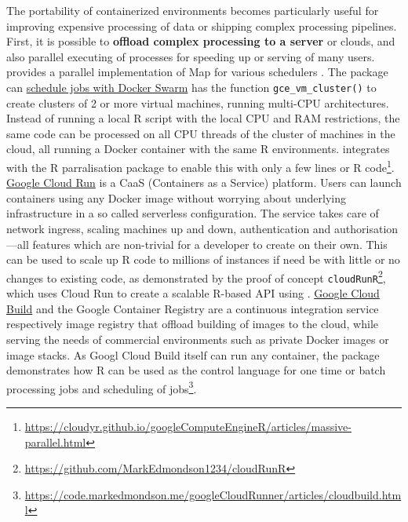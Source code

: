 The portability of containerized environments becomes particularly
useful for improving expensive processing of data or shipping complex
processing pipelines. First, it is possible to \textbf{offload complex
processing to a server} or clouds, and also parallel executing of
processes for speeding up or serving of many users.
\textbf{} provides a parallel implementation of Map
for various schedulers \citep{Lang2017batchtools}. The package can
\href{https://mllg.github.io/batchtools/reference/makeClusterFunctionsDocker.html}{schedule
jobs with Docker Swarm} \textbf{} has the
function \texttt{gce\_vm\_cluster()} to create clusters of 2 or more
virtual machines, running multi-CPU architectures. Instead of running a
local R script with the local CPU and RAM restrictions, the same code
can be processed on all CPU threads of the cluster of machines in the
cloud, all running a Docker container with the same R environments.
 integrates with the R parralisation
package  to enable this with only a few lines or R
code\footnote{\href{https://cloudyr.github.io/googleComputeEngineR/articles/massive-parallel.html}{https://cloudyr.github.io/googleComputeEngineR/articles/massive-parallel.html}}.
\href{https://cloud.run}{Google Cloud Run} is a CaaS (Containers as a
Service) platform. Users can launch containers using any Docker image
without worrying about underlying infrastructure in a so called
serverless configuration. The service takes care of network ingress,
scaling machines up and down, authentication and authorisation---all
features which are non-trivial for a developer to create on their own.
This can be used to scale up R code to millions of instances if need be
with little or no changes to existing code, as demonstrated by the proof
of concept
\texttt{cloudRunR}\footnote{\href{https://github.com/MarkEdmondson1234/cloudRunR}{https://github.com/MarkEdmondson1234/cloudRunR}},
which uses Cloud Run to create a scalable R-based API using
. \href{https://cloud.google.com/cloud-build/}{Google
Cloud Build} and the Google Container Registry are a continuous
integration service respectively image registry that offload building of
images to the cloud, while serving the needs of commercial environments
such as private Docker images or image stacks. As Googl Cloud Build
itself can run any container, the package 
demonstrates how R can be used as the control language for one time or
batch processing jobs and scheduling of
jobs\footnote{\href{https://code.markedmondson.me/googleCloudRunner/articles/cloudbuild.html}{https://code.markedmondson.me/googleCloudRunner/articles/cloudbuild.html}}.

